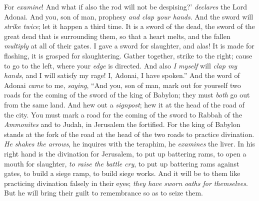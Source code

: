 \begin{biblechapter}
\verse For \textit{examine}! And what if also the rod will not be despising?’ \textit{declares} the Lord Adonai.
\verse And you, son of man, prophesy \textit{and clap your hands}. And the sword will \textit{strike twice}; let it happen a third time. It is a sword of the dead, the sword of the great dead that is surrounding them,
\verse so that a heart melts, and the fallen \textit{multiply} at all of their gates. I gave a sword for slaughter, and alas! It is made for flashing, it is grasped for slaughtering.
\verse Gather together, strike to the right; cause to go to the left, where your \textit{edge} is directed.
\verse And also \textit{I myself} will \textit{clap my hands}, and I will satisfy my rage! I, Adonai, I have spoken.”
\verse And the word of Adonai \textit{came} to me, \textit{saying},
\verse “And you, son of man, mark out for yourself two roads for the coming of the sword of the king of Babylon; they must \textit{both} go out from the same land. And hew out a \textit{signpost}; hew it at the head of the road of the city.
\verse You must mark a road for the coming of the sword to Rabbah of the \textit{Ammonites} and to Judah, in Jerusalem the fortified.
\verse For the king of Babylon stands at the fork of the road at the head of the two roads to practice divination. \textit{He shakes the arrows}, he inquires with the teraphim, he \textit{examines} the liver.
\verse In his right hand is the divination for Jerusalem, to put up battering rams, to open a mouth for slaughter, \textit{to raise the battle cry}, to put up battering rams against gates, to build a siege ramp, to build siege works.
\verse And it will be to them like practicing divination falsely in their eyes; \textit{they have sworn oaths for themselves}. But he will bring their guilt to remembrance so as to seize them.

\end{biblechapter}
